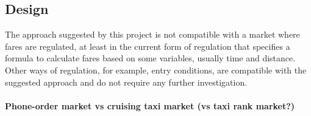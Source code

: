 \subsection{Design}The approach suggested by this project is not compatible with a market where fares are regulated, at least in the current form of regulation that specifies a formula to calculate fares based on some variables, usually time and distance. Other ways of regulation, for example, entry conditions, are compatible with the suggested approach and do not require any further investigation.

\paragraph{Phone-order market vs cruising taxi market (vs taxi rank market?)}